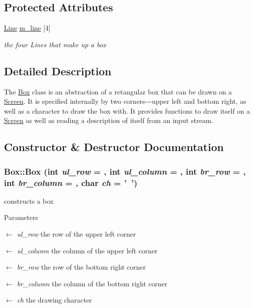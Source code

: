 \subsection*{Protected Attributes}
\begin{DoxyCompactItemize}
\item 
\hypertarget{classBox_a1b0489e286b8bf52c2f38c7042a5e617}{
\hyperlink{classLine}{Line} \hyperlink{classBox_a1b0489e286b8bf52c2f38c7042a5e617}{m\_\-line} \mbox{[}4\mbox{]}}
\label{classBox_a1b0489e286b8bf52c2f38c7042a5e617}

\begin{DoxyCompactList}\small\item\em the four Lines that make up a box \item\end{DoxyCompactList}\end{DoxyCompactItemize}


\subsection{Detailed Description}
The \hyperlink{classBox}{Box} class is an abstraction of a retangular box that can be drawn on a \hyperlink{classScreen}{Screen}. It is specified internally by two corners-\/-\/-\/upper left and bottom right, as well as a character to draw the box with. It provides functions to draw itself on a \hyperlink{classScreen}{Screen} as well as reading a description of itself from an input stream. 

\subsection{Constructor \& Destructor Documentation}
\hypertarget{classBox_a77fa7ad8be8934cbe9c3bcc86ca33998}{
\subsubsection[{Box}]{\setlength{\rightskip}{0pt plus 5cm}Box::Box (int {\em ul\_\-row} = {}, \/  int {\em ul\_\-column} = {}, \/  int {\em br\_\-row} = {}, \/  int {\em br\_\-column} = {}, \/  char {\em ch} = {\ttfamily '~'})}}
\label{classBox_a77fa7ad8be8934cbe9c3bcc86ca33998}
constructs a box


\begin{DoxyParams}{Parameters}
\item[\mbox{$\leftarrow$} {\em ul\_\-row}]the row of the upper left corner \item[\mbox{$\leftarrow$} {\em ul\_\-column}]the column of the upper left corner \item[\mbox{$\leftarrow$} {\em br\_\-row}]the row of the bottom right corner \item[\mbox{$\leftarrow$} {\em br\_\-column}]the column of the bottom right corner \item[\mbox{$\leftarrow$} {\em ch}]the drawing character \end{DoxyParams}


